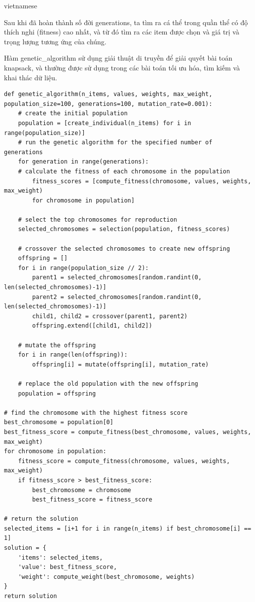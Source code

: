 \documentclass[a4paper]{article}
\begin{document}
\begin{otherlanguage*}{vietnamese}
\begin{enumerate}[leftmargin=7pt]
\begin{itemize}[leftmargin=7pt]
Sau khi đã hoàn thành số đời generations, ta tìm ra cá thể trong quần thể có độ thích nghi (fitness) cao nhất, và từ đó tìm ra các item được chọn và giá trị và trọng lượng tương ứng của chúng.

Hàm genetic\_algorithm sử dụng giải thuật di truyền để giải quyết bài toán knapsack, và thường được sử dụng trong các bài toán tối ưu hóa, tìm kiếm và khai thác dữ liệu.

\begin{verbatim}
def genetic_algorithm(n_items, values, weights, max_weight,
population_size=100, generations=100, mutation_rate=0.001):
    # create the initial population
    population = [create_individual(n_items) for i in range(population_size)]
    # run the genetic algorithm for the specified number of generations
    for generation in range(generations):
    # calculate the fitness of each chromosome in the population
        fitness_scores = [compute_fitness(chromosome, values, weights, max_weight) 
        for chromosome in population]

    # select the top chromosomes for reproduction
    selected_chromosomes = selection(population, fitness_scores)

    # crossover the selected chromosomes to create new offspring
    offspring = []
    for i in range(population_size // 2):
        parent1 = selected_chromosomes[random.randint(0, len(selected_chromosomes)-1)]
        parent2 = selected_chromosomes[random.randint(0, len(selected_chromosomes)-1)]
        child1, child2 = crossover(parent1, parent2)
        offspring.extend([child1, child2])

    # mutate the offspring
    for i in range(len(offspring)):
        offspring[i] = mutate(offspring[i], mutation_rate)

    # replace the old population with the new offspring
    population = offspring

# find the chromosome with the highest fitness score
best_chromosome = population[0]
best_fitness_score = compute_fitness(best_chromosome, values, weights, max_weight)
for chromosome in population:
    fitness_score = compute_fitness(chromosome, values, weights, max_weight)
    if fitness_score > best_fitness_score:
        best_chromosome = chromosome
        best_fitness_score = fitness_score

# return the solution
selected_items = [i+1 for i in range(n_items) if best_chromosome[i] == 1]
solution = {
    'items': selected_items,
    'value': best_fitness_score,
    'weight': compute_weight(best_chromosome, weights)
}
return solution
\end{verbatim}


\end{itemize}
\end{enumerate}
\end{otherlanguage*}
\end{document}
